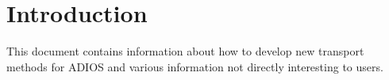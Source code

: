 \chapter{Introduction}

This document contains information about how to develop new transport methods 
for ADIOS and various information not directly interesting to users. 

